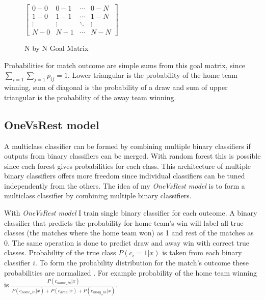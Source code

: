 \begin{figure}
    $\begin{bmatrix}
    0-0 & 0-1 & \cdots & 0-N \\
    1-0 & 1-1 & \cdots   &1-N \\
    \vdots & \vdots   & \ddots & \vdots \\
    N-0 & N-1 & \cdots & N-N\end{bmatrix}$
\caption{N by N Goal Matrix}
\label{fig:goal_matrix}
\end{figure}

Probabilities for match outcome are simple sums from this goal matrix, since $\sum_{i=1}\sum_{j=1}p_{ij} = 1$. Lower triangular is the probability of the home team winning, sum of diagonal is the probability of a draw and sum of upper triangular is the probability of the away team winning.

\subsection{OneVsRest model}
A multiclass classifier can be formed by combining multiple binary classifiers if outputs from binary classifiers can be merged. With random forest this is possible since each forest gives probabilities for each class. This architecture of multiple binary classifiers offers more freedom since individual classifiers can be tuned independently from the others. The idea of my \textit{OneVsRest model} is to form a multiclass classifier by combining multiple binary classifiers.

With \textit{OneVsRest model} I train single binary classifier for each outcome. A binary classifier that predicts the probability for home team's win will label all true classes (the matches where the home team won) as 1 and rest of the matches as 0. The same operation is done to predict draw and away win with correct true classes. Probability of the true class $P(c_i = 1 | x)$ is taken from each binary classifier $i$. To form the probability distribution for the match's outcome these probabilities are normalized \cite{zadrozny2002transforming}. For example probability of the home team winning is $\frac{P(c_{home_win}| x)}{P(c_{home_win}| x) + P(c_{draw}| x) + P(c_{away_win}| x)}$.

